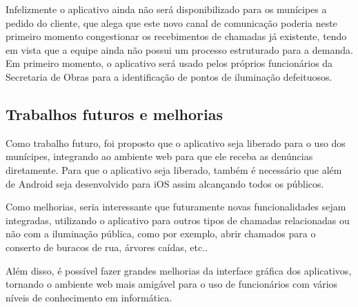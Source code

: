 \documentclass[
	article,			%
	11pt,				%
	oneside,			%
	a4paper,			%
	english,			%
	brazil,				%
	sumario=tradicional
	]{abntex2}
\begin{document}
Infelizmente o aplicativo ainda não será disponibilizado para os munícipes a pedido do cliente, que alega que este novo canal de comunicação poderia neste primeiro momento congestionar os recebimentos de chamadas já existente, tendo em vista que a equipe ainda não possui um processo estruturado para a demanda.
Em primeiro momento, o aplicativo será usado pelos próprios funcionários da Secretaria de Obras para a identificação de pontos de iluminação defeituosos.

\subsection{Trabalhos futuros e melhorias}

Como trabalho futuro, foi proposto que o aplicativo seja liberado para o uso dos munícipes, integrando ao ambiente web para que ele receba as denúncias diretamente.
Para que o aplicativo seja liberado, também é necessário que além de Android seja desenvolvido para iOS assim alcançando todos os públicos.

Como melhorias, seria interessante que futuramente novas funcionalidades sejam integradas, utilizando o aplicativo para outros tipos de chamadas relacionadas ou não com a iluminação pública, como por exemplo, abrir chamados para o conserto de buracos de rua, árvores caídas, etc..

Além disso, é possível fazer grandes melhorias da interface gráfica dos aplicativos, tornando o ambiente web mais amigável para o uso de funcionários com vários níveis de conhecimento em informática.

\postextual


\end{document}
